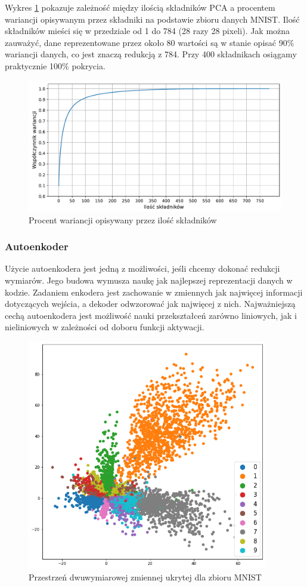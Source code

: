 \documentclass[a4paper,12pt,oneside]{book} %
\begin{document}
Wykres \ref{fig:pcacumsum} pokazuje zależność między ilością składników PCA a procentem wariancji opisywanym przez składniki na podstawie zbioru danych MNIST. Ilość składników mieści się w przedziale od 1 do 784 (28 razy 28 pixeli). Jak można zauważyć, dane reprezentowane przez około 80 wartości są w stanie opisać 90\% wariancji danych, co jest znaczą redukcją z 784. Przy 400 składnikach osiągamy praktycznie 100\% pokrycia. 
\begin{figure}[h!]
	\centering
	\includegraphics[width=\textwidth]{pcacumsum.pdf}
	\caption{Procent wariancji opisywany przez ilość składników}
	\label{fig:pcacumsum}
\end{figure}
\subsubsection{Autoenkoder}
Użycie autoenkodera jest jedną z możliwości, jeśli chcemy dokonać redukcji wymiarów. Jego budowa wymusza naukę jak najlepszej reprezentacji danych w kodzie. Zadaniem enkodera jest zachowanie w zmiennych jak najwięcej informacji dotyczących wejścia, a dekoder odwzorować jak najwięcej z nich. Najważniejszą cechą autoenkodera jest możliwość nauki przekształceń zarówno liniowych, jak i nieliniowych w zależności od doboru funkcji aktywacji.
\begin{figure}[h!]
	\centering
	\includegraphics[width=10.5cm]{pictures/aelatentspace.png}
	\caption{Przestrzeń dwuwymiarowej zmiennej ukrytej dla zbioru MNIST}
	\label{fig:latentspaceae}
\end{figure}
\end{document}
